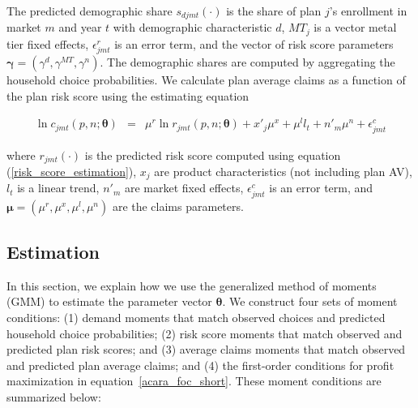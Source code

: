 \documentclass[12pt]{article}
\begin{document}
\vspace{-0.1in}

\noindent The predicted demographic share $s_{djmt}(\cdot)$ is the share of plan $j$'s enrollment in market $m$ and year $t$ with demographic characteristic $d$, $MT_j$ is a vector metal tier fixed effects,  $\epsilon_{jmt}^r$ is an error term, and the vector of risk score parameters $\boldsymbol{\gamma} = (\gamma^d,\gamma^{MT},\gamma^{n})$. The demographic shares are computed by aggregating the household choice probabilities.   We calculate plan average claims as a function of the plan risk score using the estimating equation 

\vspace{-0.4in}	

	\begin{eqnarray}\label{avg_claims_estimation}
	\ln c_{jmt}(\textit{p},\textit{n};\boldsymbol{\theta}) &=& \mu^r \ln r_{jmt}(\textit{p},\textit{n};\boldsymbol{\theta}) + x'_j  \mu^{x}  + \mu^l l_t +   n'_m \mu^{n} + \epsilon_{jmt}^c
	\end{eqnarray}

\vspace{-0.1in}

\noindent where $r_{jmt}(\cdot)$ is the predicted risk score computed using equation (\ref{risk_score_estimation}), $x_j$ are product characteristics (not including plan AV), $l_t$ is a linear trend, $n'_m$ are market fixed effects, $\epsilon_{jmt}^c$ is an error term, and  $\boldsymbol{\mu} = (\mu^r,\mu^x,\mu^l,\mu^n)$ are the claims parameters. 


\subsection{Estimation}\label{subsec:steering-methods}

In this section, we explain how we use the generalized method of moments (GMM) to estimate the parameter vector $\boldsymbol{\theta}$.  We construct four sets of moment conditions: (1) demand moments that match observed choices and predicted household choice probabilities; (2) risk score moments that match observed and predicted plan risk scores; and (3) average claims moments that match observed and predicted plan average claims; and (4) the first-order conditions for profit maximization in equation~\ref{acara_foc_short}.  These moment conditions are summarized below:

	\vspace{-0.4in}
\end{document}
